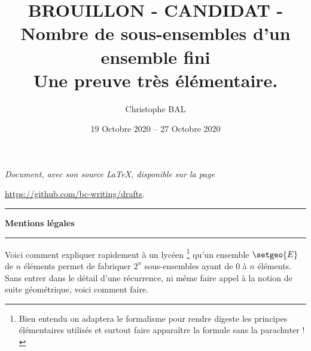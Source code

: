\documentclass[12pt]{amsart}
\begin{document}
\title{BROUILLON - CANDIDAT - Nombre de sous-ensembles d'un ensemble fini\\Une preuve très élémentaire.}
\author{Christophe BAL}
\date{19 Octobre 2020 -- 27 Octobre 2020}


\maketitle

\begin{center}
	\itshape
	Document, avec son source \LaTeX, disponible sur la page
	
	\url{https://github.com/bc-writing/drafts}.
\end{center}


\bigskip


\begin{center}
	\hrule\vspace{.3em}
	{
		\fontsize{1.35em}{1em}\selectfont
		\textbf{Mentions \og légales \fg}
	}
			
	\vspace{0.45em}
	\doclicenseThis
	\hrule
\end{center}


\bigskip



Voici comment expliquer rapidement à un lycéen
\footnote{
	Bien entendu on adaptera le formalisme pour rendre digeste les principes élémentaires utilisés et surtout faire apparaître la formule sans la parachuter !
}
qu'un ensemble $\setgeo{E}$ de $n$ éléments permet de fabriquer $2^n$ sous-ensembles ayant de $0$ à $n$ éléments. Sans entrer dans le détail d'une récurrence, ni même faire appel à la notion de suite géométrique, voici comment faire.
\end{document}
